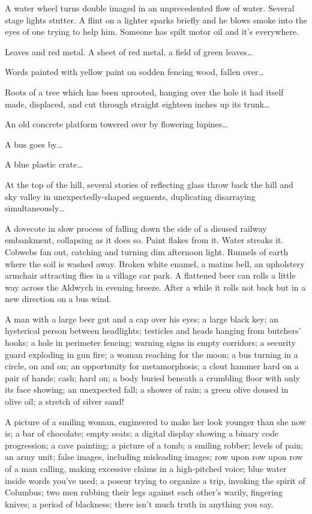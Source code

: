 \documentclass[
]{memoir}
\begin{document}
A water wheel turns double imaged in an unprecedented flow of water.
Several stage lights stutter. A flint on a lighter sparks briefly and he
blows smoke into the eyes of one trying to help him. Someone has spilt
motor oil and it's everywhere.

Leaves and red metal. A sheet of red metal, a field of green
leaves\ldots{}

Words painted with yellow paint on sodden fencing wood, fallen
over\ldots{}

Roots of a tree which has been uprooted, hanging over the hole it had
itself made, displaced, and cut through straight eighteen inches up its
trunk\ldots{}

An old concrete platform towered over by flowering lupines\ldots{}

A bus goes by\ldots{}

A blue plastic crate\ldots{}

At the top of the hill, several stories of reflecting glass throw back
the hill and sky valley in unexpectedly-shaped segments, duplicating
disarraying simultaneously\ldots{}

A dovecote in slow process of falling down the side of a disused railway
embankment, collapsing as it does so. Paint flakes from it. Water
streaks it. Cobwebs fan out, catching and turning dim afternoon light.
Runnels of earth where the soil is washed away. Broken white enamel, a
matins bell, an upholstery armchair attracting flies in a village car
park. A flattened beer can rolls a little way across the Aldwych in
evening breeze. After a while it rolls not back but in a new direction
on a bus wind.

A man with a large beer gut and a cap over his eyes; a large black key;
an hysterical person between headlights; testicles and heads hanging
from butchers' hooks; a hole in perimeter fencing; warning signs in
empty corridors; a security guard exploding in gun fire; a woman
reaching for the moon; a bus turning in a circle, on and on; an
opportunity for metamorphosis; a clout hammer hard on a pair of hands;
cash; hard on; a body buried beneath a crumbling floor with only its
face showing; an unexpected fall; a shower of rain; a green olive doused
in olive oil; a stretch of silver sand!

A picture of a smiling woman, engineered to make her look younger than
she now is; a bar of chocolate; empty seats; a digital display showing a
binary code progression; a cave painting; a picture of a tomb; a smiling
robber; levels of pain; an army unit; false images, including misleading
images; row upon row upon row of a man calling, making excessive claims
in a high-pitched voice; blue water inside words you've used; a poseur
trying to organize a trip, invoking the spirit of Columbus; two men
rubbing their legs against each other's warily, fingering knives; a
period of blackness; there isn't much truth in anything you say.
\end{document}
